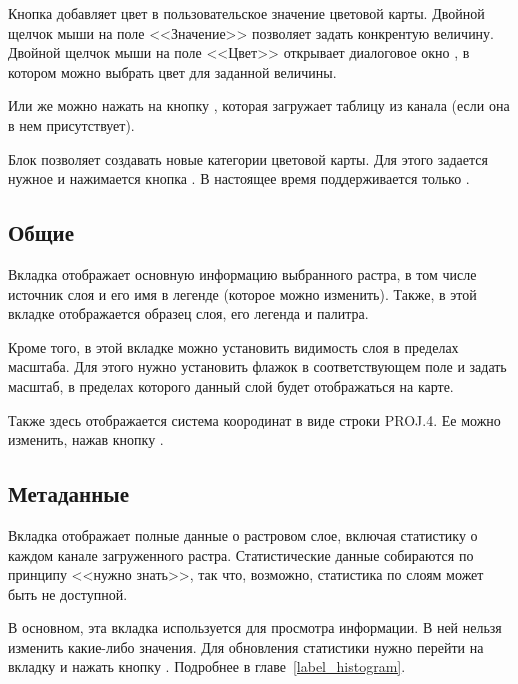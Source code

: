 Кнопка  добавляет цвет в пользовательское
значение цветовой карты. Двойной щелчок мыши на поле <<Значение>>
позволяет задать конкрентую величину. Двойной щелчок мыши на поле
<<Цвет>> открывает диалоговое окно , в котором
можно выбрать цвет для заданной величины.

Или же можно нажать на кнопку
,
которая загружает таблицу из канала (если она в нем присутствует).

Блок  позволяет создавать
новые категории цветовой карты. Для этого задается нужное
 и нажимается кнопка
. В настоящее время поддерживается только
.

\subsection{Общие}\label{label_generaltab}

Вкладка  отображает основную информацию выбранного растра,
в том числе источник слоя и его имя в легенде (которое можно изменить).
Также, в этой вкладке отображается образец слоя, его легенда и палитра.

Кроме того, в этой вкладке можно установить видимость слоя в пределах
масштаба. Для этого нужно установить флажок в соответствующем поле и
задать масштаб, в пределах которого данный слой будет отображаться на
карте.

Также здесь отображается система коородинат в виде строки PROJ.4. Ее
можно изменить, нажав кнопку .

\subsection{Метаданные}\label{label_metatab}

Вкладка  отображает полные данные о растровом слое,
включая статистику о каждом канале загруженного растра. Статистические
данные собираются по принципу <<нужно знать>>, так что, возможно,
статистика по слоям может быть не доступной.

В основном, эта вкладка используется для просмотра информации. В ней
нельзя изменить какие-либо значения. Для обновления статистики нужно
перейти на вкладку  и нажать кнопку .
Подробнее в главе~\ref{label_histogram}.

